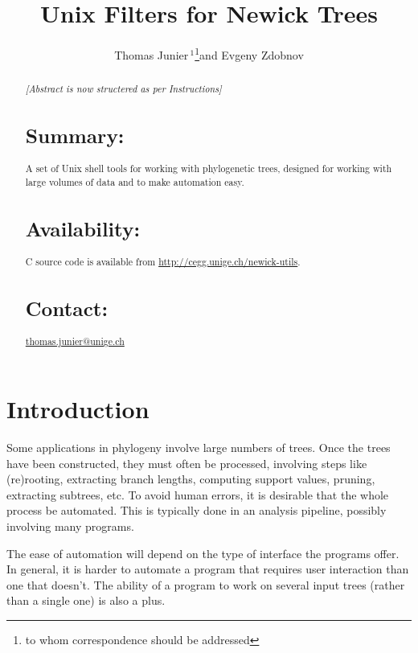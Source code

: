 \documentclass{bioinfo}
\newcommand{\unix}{Unix}
\newcommand{\unix}{\textsc{Unix}}
\begin{document}

\title{\unix{} Filters for Newick Trees}
\author[Junier and Zdobnov]{Thomas Junier\,$^{1}$\footnote{to whom correspondence should be addressed}\hspace{1em}and Evgeny Zdobnov}
\address{$^{1}$Department of Genetic and Development Medicine, Faculty of Medicine, University of Geneva, Geneva, Switzerland}




\maketitle

\begin{abstract}
\emph{[Abstract is now structered as per Instructions]}
\section{Summary:}
A set of \unix{} shell tools for working with phylogenetic trees, designed for working with large volumes of data and to make automation easy.
\section{Availability:}
C source code is available from \url{http://cegg.unige.ch/newick-utils}.
\section{Contact:}
\href{thomas.junier@unige.ch}{thomas.junier@unige.ch}
\end{abstract}
 
\section{Introduction}

Some applications in phylogeny involve large numbers of trees. Once the trees have been constructed, they must often be processed, involving steps like (re)rooting, extracting branch lengths, computing support values, pruning, extracting subtrees, etc. To avoid human errors, it is desirable that the whole process  be automated. This is typically done in an analysis pipeline, possibly involving many programs.

The ease of automation will depend on the type of interface the programs offer. In general, it is harder to automate a program that requires user interaction than one that doesn't. The ability of a program to work on several input trees (rather than a single one) is also a plus.
\end{document}
